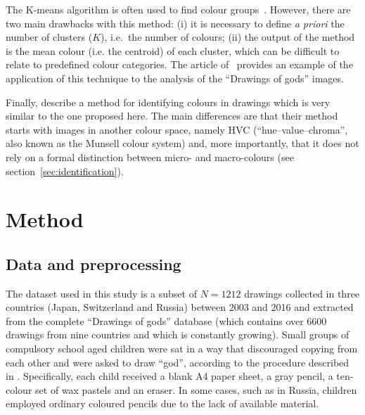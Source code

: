 \documentclass[11pt,a4paper]{article}
\begin{document}
The K-means algorithm is often used to find colour groups~\cite[see e.g.][]{yendrikhovskij2001,konyushkova2015,hulee2007}. However, there are two main drawbacks with this method: (i) it is necessary to define \textit{a priori} the number of clusters ($K$), i.e.~the number of colours; (ii) the output of the method is the mean colour (i.e. the centroid) of each cluster, which can be difficult to relate to predefined colour categories. The article of~\citet{konyushkova2015} provides an example of the application of this technique to the analysis of the ``Drawings of gods'' images.

Finally, \citet{kimbaelee2007} describe a method for identifying colours in drawings which is very similar to the one proposed here. The main differences are that their method starts with images in another colour space, namely HVC (``hue--value--chroma'', also known as the Munsell colour system) and, more importantly, that it does not rely on a formal distinction between micro- and macro-colours (see section~\ref{sec:identification}).


\section{Method}\label{methods}
\label{sec:method}

\subsection{Data and preprocessing}
\label{sec:dataset_preprocessing}

The dataset used in this study is a subset of $N = 1212$ drawings collected in three countries (Japan, Switzerland and Russia) between 2003 and 2016 and extracted from the complete ``Drawings of gods'' database (which contains over 6600 drawings from nine countries and which is constantly growing). Small groups of compulsory school aged children were sat in a way that discouraged copying from each other and were asked to draw ``god'', according to the procedure described in \citet{DandarovaRobertDessartSerbaevaEtAl2016}. Specifically, each child received a blank A4 paper sheet, a gray pencil, a ten-colour set of wax pastels and an eraser. In some cases, such as in Russia, children employed ordinary coloured pencils due to the lack of available material.
\end{document}
